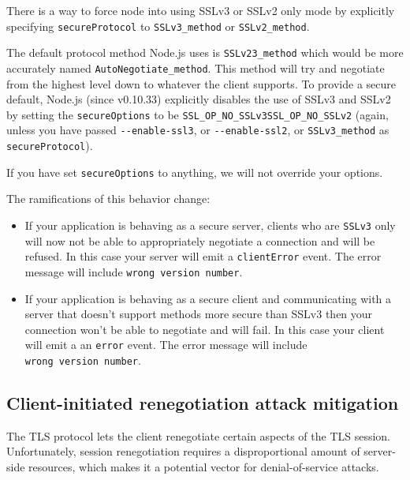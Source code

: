 There is a way to force node into using SSLv3 or SSLv2 only mode by
explicitly specifying \texttt{secureProtocol} to
\texttt{\textquotesingle{}SSLv3\_method\textquotesingle{}} or
\texttt{\textquotesingle{}SSLv2\_method\textquotesingle{}}.

The default protocol method Node.js uses is \texttt{SSLv23\_method}
which would be more accurately named \texttt{AutoNegotiate\_method}.
This method will try and negotiate from the highest level down to
whatever the client supports. To provide a secure default, Node.js
(since v0.10.33) explicitly disables the use of SSLv3 and SSLv2 by
setting the \texttt{secureOptions} to be
\texttt{SSL\_OP\_NO\_SSLv3\textbar{}SSL\_OP\_NO\_SSLv2} (again, unless
you have passed \texttt{-\/-enable-ssl3}, or \texttt{-\/-enable-ssl2},
or \texttt{SSLv3\_method} as \texttt{secureProtocol}).

If you have set \texttt{secureOptions} to anything, we will not override
your options.

The ramifications of this behavior change:

\begin{itemize}
\itemsep1pt\parskip0pt
\item
  If your application is behaving as a secure server, clients who are
  \texttt{SSLv3} only will now not be able to appropriately negotiate a
  connection and will be refused. In this case your server will emit a
  \texttt{clientError} event. The error message will include
  \texttt{\textquotesingle{}wrong\ version\ number\textquotesingle{}}.
\item
  If your application is behaving as a secure client and communicating
  with a server that doesn't support methods more secure than SSLv3 then
  your connection won't be able to negotiate and will fail. In this case
  your client will emit a an \texttt{error} event. The error message
  will include
  \texttt{\textquotesingle{}wrong\ version\ number\textquotesingle{}}.
\end{itemize}

\subsection{Client-initiated renegotiation attack
mitigation}\label{client-initiated-renegotiation-attack-mitigation}

The TLS protocol lets the client renegotiate certain aspects of the TLS
session. Unfortunately, session renegotiation requires a disproportional
amount of server-side resources, which makes it a potential vector for
denial-of-service attacks.

